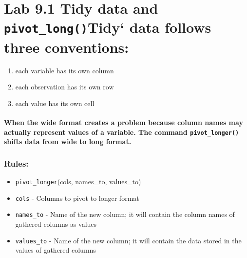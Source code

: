 \documentclass[
]{article}
\providecommand{\tightlist}{%
  \setlength{\itemsep}{0pt}\setlength{\parskip}{0pt}}
\begin{document}
\hypertarget{lab-9.1-tidy-data-and-pivot_longtidy-data-follows-three-conventions}{%
\section{\texorpdfstring{Lab 9.1 Tidy data and
\texttt{pivot\_long()}Tidy` data follows three
conventions:}{Lab 9.1 Tidy data and pivot\_long()Tidy` data follows three conventions:}}\label{lab-9.1-tidy-data-and-pivot_longtidy-data-follows-three-conventions}}

\begin{enumerate}
\def\labelenumi{(\arabic{enumi})}
\tightlist
\item
  each variable has its own column\\
\item
  each observation has its own row\\
\item
  each value has its own cell
\end{enumerate}

\hypertarget{when-the-wide-format-creates-a-problem-because-column-names-may-actually-represent-values-of-a-variable.-the-command-pivot_longer-shifts-data-from-wide-to-long-format.}{%
\paragraph{\texorpdfstring{When the wide format creates a problem
because column names may actually represent values of a variable. The
command \texttt{pivot\_longer()} shifts data from wide to long
format.}{When the wide format creates a problem because column names may actually represent values of a variable. The command pivot\_longer() shifts data from wide to long format.}}\label{when-the-wide-format-creates-a-problem-because-column-names-may-actually-represent-values-of-a-variable.-the-command-pivot_longer-shifts-data-from-wide-to-long-format.}}

\hypertarget{rules}{%
\subsubsection{Rules:}\label{rules}}

\begin{itemize}
\tightlist
\item
  \texttt{pivot\_longer}(cols, names\_to, values\_to)
\item
  \texttt{cols} - Columns to pivot to longer format
\item
  \texttt{names\_to} - Name of the new column; it will contain the
  column names of gathered columns as values
\item
  \texttt{values\_to} - Name of the new column; it will contain the data
  stored in the values of gathered columns
\end{itemize}
\end{document}
